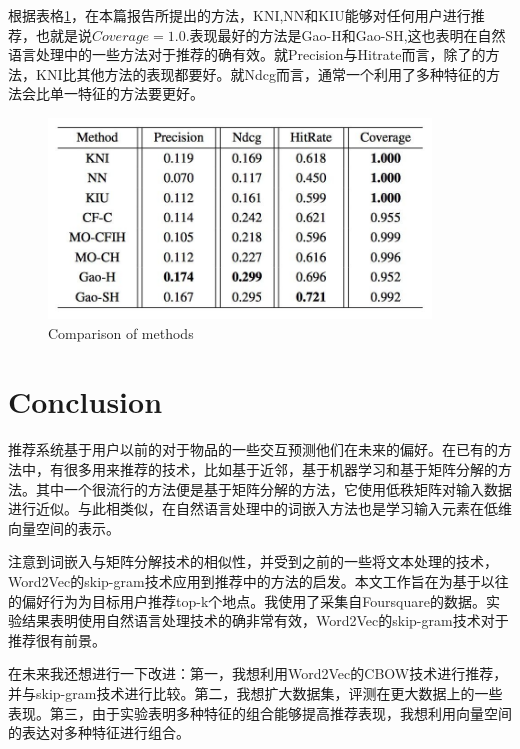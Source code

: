 \documentclass[UTF8]{ctexart}
\begin{document}
	
	根据表格\ref{tab:1}，在本篇报告所提出的方法，KNI,NN和KIU能够对任何用户进行推荐，也就是说$Coverage=1.0$.表现最好的方法是Gao-H和Gao-SH,这也表明在自然语言处理中的一些方法对于推荐的确有效。就Precision与Hitrate而言，除了\cite{gao2012exploring}的方法，KNI比其他方法的表现都要好。就Ndcg而言，通常一个利用了多种特征的方法会比单一特征的方法要更好。
	\begin{figure}
		\begin{center}
			\includegraphics[width=4in]{7}
		\end{center}
		\caption{Comparison of methods}
		\label{tab:1}
	\end{figure}
	
	\section{Conclusion}
	推荐系统基于用户以前的对于物品的一些交互预测他们在未来的偏好。在已有的方法中，有很多用来推荐的技术，比如基于近邻，基于机器学习和基于矩阵分解的方法。其中一个很流行的方法便是基于矩阵分解的方法，它使用低秩矩阵对输入数据进行近似。与此相类似，在自然语言处理中的词嵌入方法也是学习输入元素在低维向量空间的表示。
	
	注意到词嵌入与矩阵分解技术的相似性，并受到之前的一些将文本处理的技术， Word2Vec的skip-gram技术应用到推荐中的方法的启发。本文工作旨在为基于以往的偏好行为为目标用户推荐top-k个地点。我使用了采集自Foursquare的数据。实验结果表明使用自然语言处理技术的确非常有效，Word2Vec的skip-gram技术对于推荐很有前景。
	
	在未来我还想进行一下改进：第一，我想利用Word2Vec的CBOW技术进行推荐，并与skip-gram技术进行比较。第二，我想扩大数据集，评测在更大数据上的一些表现。第三，由于实验表明多种特征的组合能够提高推荐表现，我想利用向量空间的表达对多种特征进行组合。
	

	
	
	
	
\end{document}

